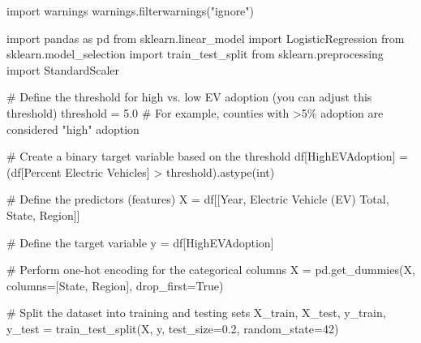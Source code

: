 \documentclass[
  letterpaper,
  DIV=11,
  numbers=noendperiod]{scrartcl}
\newenvironment{Shaded}{\begin{snugshade}}{\end{snugshade}}
\newcommand{\BuiltInTok}[1]{\textcolor[rgb]{0.00,0.23,0.31}{#1}}
\newcommand{\CommentTok}[1]{\textcolor[rgb]{0.37,0.37,0.37}{#1}}
\newcommand{\DecValTok}[1]{\textcolor[rgb]{0.68,0.00,0.00}{#1}}
\newcommand{\FloatTok}[1]{\textcolor[rgb]{0.68,0.00,0.00}{#1}}
\newcommand{\ImportTok}[1]{\textcolor[rgb]{0.00,0.46,0.62}{#1}}
\newcommand{\NormalTok}[1]{\textcolor[rgb]{0.00,0.23,0.31}{#1}}
\newcommand{\OperatorTok}[1]{\textcolor[rgb]{0.37,0.37,0.37}{#1}}
\newcommand{\StringTok}[1]{\textcolor[rgb]{0.13,0.47,0.30}{#1}}
\newcommand{\VariableTok}[1]{\textcolor[rgb]{0.07,0.07,0.07}{#1}}
\begin{document}
\begin{Shaded}
\begin{Highlighting}[]
\ImportTok{import}\NormalTok{ warnings}
\NormalTok{warnings.filterwarnings(}\StringTok{"ignore"}\NormalTok{)}



\ImportTok{import}\NormalTok{ pandas }\ImportTok{as}\NormalTok{ pd}
\ImportTok{from}\NormalTok{ sklearn.linear\_model }\ImportTok{import}\NormalTok{ LogisticRegression}
\ImportTok{from}\NormalTok{ sklearn.model\_selection }\ImportTok{import}\NormalTok{ train\_test\_split}
\ImportTok{from}\NormalTok{ sklearn.preprocessing }\ImportTok{import}\NormalTok{ StandardScaler}

\CommentTok{\# Define the threshold for high vs. low EV adoption (you can adjust this threshold)}
\NormalTok{threshold }\OperatorTok{=} \FloatTok{5.0}  \CommentTok{\# For example, counties with \textgreater{}5\% adoption are considered "high" adoption}

\CommentTok{\# Create a binary target variable based on the threshold}
\NormalTok{df[}\StringTok{\textquotesingle{}HighEVAdoption\textquotesingle{}}\NormalTok{] }\OperatorTok{=}\NormalTok{ (df[}\StringTok{\textquotesingle{}Percent Electric Vehicles\textquotesingle{}}\NormalTok{] }\OperatorTok{\textgreater{}}\NormalTok{ threshold).astype(}\BuiltInTok{int}\NormalTok{)}

\CommentTok{\# Define the predictors (features)}
\NormalTok{X }\OperatorTok{=}\NormalTok{ df[[}\StringTok{\textquotesingle{}Year\textquotesingle{}}\NormalTok{, }\StringTok{\textquotesingle{}Electric Vehicle (EV) Total\textquotesingle{}}\NormalTok{, }\StringTok{\textquotesingle{}State\textquotesingle{}}\NormalTok{, }\StringTok{\textquotesingle{}Region\textquotesingle{}}\NormalTok{]]}

\CommentTok{\# Define the target variable}
\NormalTok{y }\OperatorTok{=}\NormalTok{ df[}\StringTok{\textquotesingle{}HighEVAdoption\textquotesingle{}}\NormalTok{]}

\CommentTok{\# Perform one{-}hot encoding for the categorical columns}
\NormalTok{X }\OperatorTok{=}\NormalTok{ pd.get\_dummies(X, columns}\OperatorTok{=}\NormalTok{[}\StringTok{\textquotesingle{}State\textquotesingle{}}\NormalTok{, }\StringTok{\textquotesingle{}Region\textquotesingle{}}\NormalTok{], drop\_first}\OperatorTok{=}\VariableTok{True}\NormalTok{)}

\CommentTok{\# Split the dataset into training and testing sets}
\NormalTok{X\_train, X\_test, y\_train, y\_test }\OperatorTok{=}\NormalTok{ train\_test\_split(X, y, test\_size}\OperatorTok{=}\FloatTok{0.2}\NormalTok{, random\_state}\OperatorTok{=}\DecValTok{42}\NormalTok{)}


\end{Highlighting}
\end{Shaded}
\end{document}
